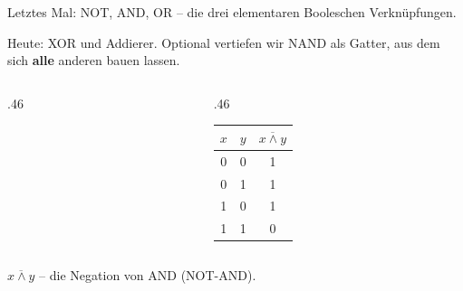 \renewcommand{\thelektion}{L09 \textperiodcentered{} Logische Gatter II}
\usetikzlibrary{circuits.logic.US}

\begin{frame}\end{frame}

\begin{frame}
\begin{center}
Letztes Mal: NOT, AND, OR -- die drei elementaren Booleschen Verknüpfungen.
\vspace{4mm}

Heute: XOR und Addierer. Optional vertiefen wir NAND als Gatter, aus dem sich \textbf{alle} anderen bauen lassen.
\end{center}
\end{frame}

\begin{frame}
\begin{columns}[c,onlytextwidth]
\begin{column}{.46\textwidth}

\end{column}
\begin{column}{.46\textwidth}
\begin{tabular}{ccc}
    $x$ & $y$ & $\overline{x \wedge y}$ \\\midrule
    0 & 0 & 1 \\
    0 & 1 & 1 \\
    1 & 0 & 1 \\
    1 & 1 & 0 \\
\end{tabular}
\end{column}
\end{columns}
\vspace{3mm}
\begin{center}$\overline{x \wedge y}$ -- die Negation von AND (NOT-AND).\end{center}
\end{frame}

